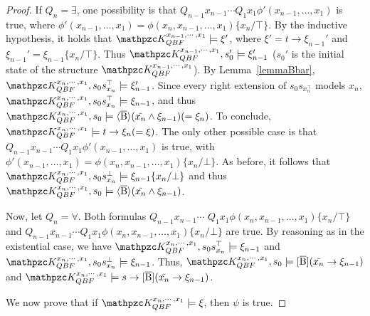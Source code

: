 \begin{proof}
If
$Q_n=\exists$, one possibility is that $Q_{n-1} x_{n-1} \cdots Q_1 x_1 \phi'(x_{n-1},\ldots , x_1)$ is true, where $\phi'(x_{n-1},\ldots , x_1)=\phi(x_n,x_{n-1},\ldots , x_1)\{x_n/ \top\}$. By the inductive hypothesis, it holds that $\Ku_{QBF}^{x_{n-1},\cdots , x_1}\models\xi'$, where $\xi'=t\rightarrow\xi_{n-1}'$ and $\xi_{n-1}'=\xi_{n-1}\{x_n/\top\}$. Thus $\Ku_{QBF}^{x_{n-1},\cdots , x_1},s_0'\models \xi_{n-1}'$ ($s_0'$ is the initial state of the structure $\Ku_{QBF}^{x_{n-1},\cdots , x_1}$). By Lemma~\ref{lemmaBbar}, $\Ku_{QBF}^{x_n,\cdots , x_1},s_0s_{x_n}^\top\models \xi_{n-1}'$. Since every right extension of $s_0s_{x_n^\top}$ models $x_n$, $\Ku_{QBF}^{x_n,\cdots , x_1},s_0s_{x_n}^\top\models \xi_{n-1}$, and thus $\Ku_{QBF}^{x_n,\cdots , x_1},s_0\models \hsBt(\tilde{x_n}\wedge\xi_{n-1})(=\xi_n)$. To conclude, $\Ku_{QBF}^{x_n,\cdots , x_1}\models t\rightarrow\xi_n(=\xi)$. The only other possible case is that $Q_{n-1} x_{n-1} \cdots Q_1 x_1 \phi'(x_{n-1},\ldots , x_1)$ is true, with $\phi'(x_{n-1},\ldots , x_1)=\phi(x_n,x_{n-1},\ldots ,\allowbreak x_1)\{x_n/ \bot\}$. As before, it follows that $\Ku_{QBF}^{x_n,\cdots , x_1},s_0s_{x_n}^\bot\models \xi_{n-1}\{x_n/\bot\}$ and thus $\Ku_{QBF}^{x_n,\cdots , x_1},s_0\models \hsBt(\tilde{x_n}\wedge\xi_{n-1})$.

Now, let 
$Q_n=\forall$. Both formulas $Q_{n-1} x_{n-1} \cdots$ $Q_1 x_1 \phi(x_n,x_{n-1},\ldots , x_1)\{x_n/ \top\}$ and  $Q_{n-1} x_{n-1} \cdots Q_1 x_1 \phi(x_n,x_{n-1},\ldots , x_1)\{x_n/ \bot\}$ are true. By reasoning as in the existential case, we have $\Ku_{QBF}^{x_n,\cdots , x_1},s_0s_{x_n}^\top\models \xi_{n-1}$ and $\Ku_{QBF}^{x_n,\cdots , x_1},s_0s_{x_n}^\bot\models \xi_{n-1}$. Thus, $\Ku_{QBF}^{x_n,\cdots , x_1},s_0\models \hsBtu(\tilde{x_n}\rightarrow \xi_{n-1})$ and $\Ku_{QBF}^{x_n,\cdots , x_1}\models s\rightarrow \hsBtu(\tilde{x_n}\rightarrow \xi_{n-1})$.

We now prove that if $\Ku_{QBF}^{x_n,\cdots , x_1}\models\xi$, then $\psi$
is true.


\end{proof}
